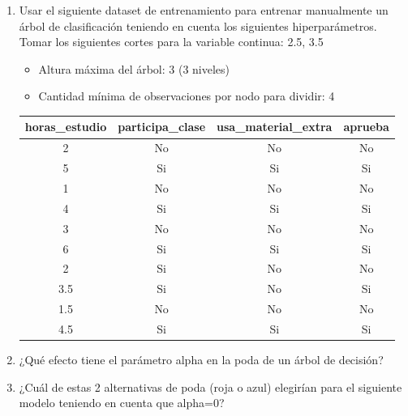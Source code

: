 \documentclass[12pt]{article}
\begin{document}
\begin{enumerate}
  \item Usar el siguiente dataset de entrenamiento para entrenar manualmente un árbol de clasificación teniendo en cuenta los siguientes hiperparámetros. Tomar los siguientes cortes para la variable continua: 2.5, 3.5
    \begin{itemize}
      \item Altura máxima del árbol: 3 (3 niveles)
      \item Cantidad mínima de observaciones por nodo para dividir: 4
    \end{itemize}
    
    \begin{center}
    \begin{tabular}{cccc}
    \toprule
    horas\_estudio & participa\_clase & usa\_material\_extra & aprueba \\
    \midrule
    2 & No & No & No \\
    5 & Si & Si & Si \\
    1 & No & No & No \\
    4 & Si & Si & Si \\
    3 & No & No & No \\
    6 & Si & Si & Si \\
    2 & Si & No & No \\
    3.5 & Si & No & Si \\
    1.5 & No & No & No \\
    4.5 & Si & Si & Si \\
    \bottomrule
    \end{tabular}
    \end{center}

  \item ¿Qué efecto tiene el parámetro alpha en la poda de un árbol de decisión?

  \item ¿Cuál de estas 2 alternativas de poda (roja o azul) elegirían para el siguiente modelo teniendo en cuenta que alpha=0?
    

\end{enumerate}
\end{document}
